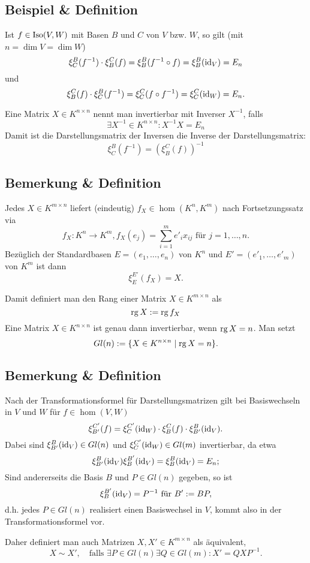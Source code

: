 \subsection{Beispiel \& Definition}
	Ist $ f\in \operatorname{Iso}(V,W) $ mit Basen $ B $ und $ C $ von $ V $ bzw. $ W $, so gilt (mit $ n=\dim V = \dim W $)
		\[ \xi_C^B(f^{-1})\cdot \xi_B^C(f) = \xi_B^B(f^{-1}\circ f) = \xi_B^B(\operatorname{id}_V) = E_n \]
	und
		\[ \xi_B^C(f)\cdot \xi_C^B(f^{-1})=\xi_C^C(f\circ f^{-1}) = \xi_C^C(\operatorname{id}_W)=E_n. \]
		
	\begin{Definition}
	Eine Matrix $ X\in K^{n\times n} $ nennt man invertierbar mit Inverser $ X^{-1} $, falls
		\[ \exists X^{-1}\in K^{n\times n}:X^{-1}X = E_n \]
	Damit ist die Darstellungsmatrix der Inversen die Inverse der Darstellungsmatrix:
		\[ \xi_C^B(f^{-1}) = (\xi_B^C(f))^{-1} \]
	\end{Definition}
\subsection{Bemerkung \& Definition}
	Jedes $ X\in K^{m\times n} $ liefert (eindeutig) $ f_X\in \hom(K^n,K^m) $ nach Fortsetzungssatz via
		\[ f_X:K^n\to K^m, f_X(e_j) = \sum_{i=1}^{m} e'_ix_{ij} \text{ für } j=1,\dots,n. \]
	Bezüglich der Standardbasen $ E = (e_1,\dots,e_n) $ von $ K^n $ und $ E'=(e'_1,\dots,e'_m) $ von $ K^m $ ist dann
		\[ \xi_E^{E'}(f_X) = X. \]

	\begin{Definition}
	Damit definiert man den Rang einer Matrix $ X\in K^{m\times n} $ als 
		\[ \operatorname{rg} X:=\operatorname{rg} f_X \]
	Eine Matrix $ X\in K^{n\times n} $ ist genau dann invertierbar, wenn $ \operatorname{rg} X = n $. Man setzt
		\[ Gl(n):= \{X\in K^{n\times n}\mid \operatorname{rg} X =n\}. \]
	\end{Definition}
\subsection{Bemerkung \& Definition}
	Nach der Transformationsformel für Darstellungsmatrizen gilt bei Basiswechseln in $ V $ und $ W $ für $ f\in \hom(V,W) $
		\[ \xi_{B'}^{C'}(f) = \xi_C^{C'}(\operatorname{id}_W)\cdot \xi_B^C(f)\cdot \xi_{B'}^B(\operatorname{id}_V). \]
	Dabei sind $ \xi_{B'}^B(\operatorname{id}_V)\in Gl(n) $ und $ \xi_C^{C'}(\operatorname{id}_W)\in Gl(m) $ invertierbar, da etwa
		\[ \xi^B_{B'}(\operatorname{id}_V)\xi_B^{B'}(\operatorname{id}_V) = \xi_B^B(\operatorname{id}_V)=E_n; \]
	Sind andererseits die Basis $ B $ und $ P\in Gl(n) $ gegeben, so ist
		\[ \xi_B^{B'}(\operatorname{id}_V)=P^{-1} \text{ für } B':= BP, \]
	d.h. jedes $ P\in Gl(n) $ realisiert einen Basiswechsel in $ V $, kommt also in der Transformationsformel vor.
	
	\begin{Definition}
	Daher definiert man auch Matrizen $ X,X'\in K^{m\times n} $ als äquivalent,
		\[ X\sim X',\quad \text{falls }\exists P\in Gl(n)\exists Q\in Gl(m):X' = QXP^{-1}.  \]
	\end{Definition}
